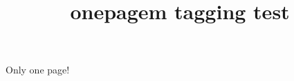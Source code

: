 \documentclass{article}
\title{onepagem tagging test}
\begin{document}
Only one page!

\end{document}

